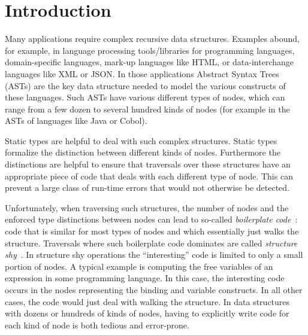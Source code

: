 \section{Introduction}

Many applications require complex recursive data structures. Examples
abound, for example, in language processing tools/libraries for programming
languages, domain-specific languages, mark-up languages like HTML, or
data-interchange languages like XML or JSON. In those applications
Abstract Syntax Trees (ASTs) are the key data structure needed to
model the various constructs of these languages. Such ASTs have various
different types of nodes, which can range from a few dozen to
several hundred kinds of nodes (for example in the ASTs of languages
like Java or Cobol).

Static types are helpful to deal with such complex structures.  Static types formalize the distinction between different kinds of
nodes. Furthermore the distinctions are helpful to ensure that
traversals over these structures have an appropriate piece of code that
deals with each different type of node. This can prevent a large class
of run-time errors that would not otherwise be detected.


Unfortunately, when traversing such structures, the number of nodes and the
enforced type distinctions between nodes can lead to so-called
\emph{boilerplate code}~\cite{ralf03syb}: code that is similar for most types of nodes and which
essentially just walks the structure. Traversals where such boilerplate
code dominates are called \emph{structure shy}~\cite{DemeterBook}. In
structure shy operations the ``interesting'' code is limited to only a small portion of nodes.
A typical example is computing the free
variables of an expression in some programming language. In this
case, the interesting code occurs in the nodes representing the
binding and variable constructs. In all other cases, the code would just deal with
walking the structure. In data structures with dozens or hundreds of
kinds of nodes, having to explicitly write code for each kind of node is both tedious and error-prone.

